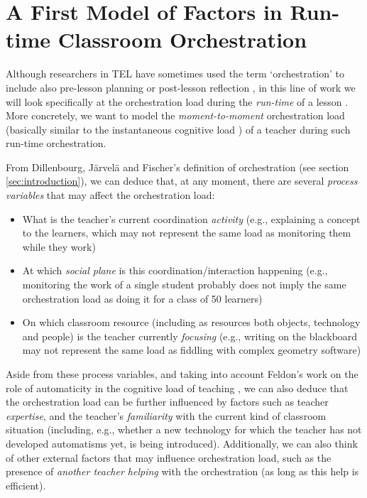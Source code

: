 \documentclass[10pt,journal,compsoc]{IEEEtran}
\begin{document}
\section{A First Model of Factors in Run-time Classroom Orchestration}
\label{sec:model}

Although researchers in TEL have sometimes used the term `orchestration' to include also pre-lesson planning or post-lesson reflection \cite{Prieto2011}, in this line of work we will look specifically at the orchestration load during the \textit{run-time} of a lesson \cite{Dillenbourg2013}. More concretely, we want to model the \textit{moment-to-moment} orchestration load (basically similar to the instantaneous cognitive load \cite{xie2000prediction}) of a teacher during such run-time orchestration.

From Dillenbourg, J\"arvel\"a and Fischer's definition of orchestration \cite{Dillenbourg2009} (see section \ref{sec:introduction}), we can deduce that, at any moment, there are several \textit{process variables} that may affect the orchestration load: 

\begin{itemize}
\item What is the teacher's current coordination \textit{activity} (e.g., explaining a concept to the learners, which may not represent the same load as monitoring them while they work)
\item At which \textit{social plane} is this coordination/interaction happening (e.g., monitoring the work of a single student probably does not imply the same orchestration load as doing it for a class of 50 learners)
\item On which classroom resource (including as resources both objects, technology and people) is the teacher currently \textit{focusing} (e.g., writing on the blackboard may not represent the same load as fiddling with complex geometry software)
\end{itemize}

Aside from these process variables, and taking into account Feldon's work on the role of automaticity in the cognitive load of teaching \cite{feldon2007cognitive}, we can also deduce that the orchestration load can be further influenced by factors such as teacher \textit{expertise}, and the teacher's \textit{familiarity} with the current kind of classroom situation (including, e.g., whether a new technology for which the teacher has not developed automatisms yet, is being introduced). Additionally, we can also think of other external factors that may influence orchestration load, such as the presence of \textit{another teacher helping} with the orchestration (as long as this help is efficient).
\end{document}

